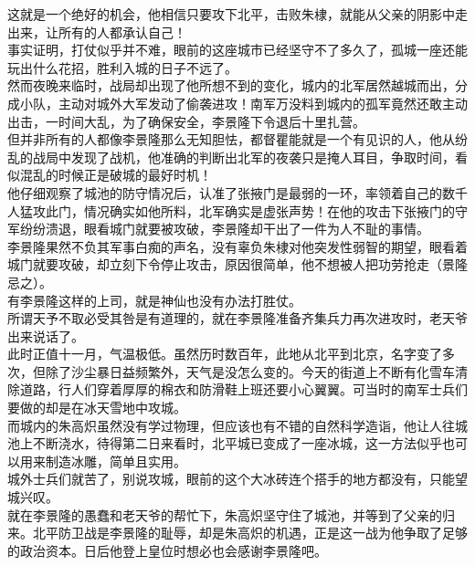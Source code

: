 \begin{multicols}{\theparacolNo}
这就是一个绝好的机会，他相信只要攻下北平，击败朱棣，就能从父亲的阴影中走出来，让所有的人都承认自己！\\

事实证明，打仗似乎并不难，眼前的这座城市已经坚守不了多久了，孤城一座还能玩出什么花招，胜利入城的日子不远了。\\

然而夜晚来临时，战局却出现了他所想不到的变化，城内的北军居然越城而出，分成小队，主动对城外大军发动了偷袭进攻！南军万没料到城内的孤军竟然还敢主动出击，一时间大乱，为了确保安全，李景隆下令退后十里扎营。\\

但并非所有的人都像李景隆那么无知胆怯，都督瞿能就是一个有见识的人，他从纷乱的战局中发现了战机，他准确的判断出北军的夜袭只是掩人耳目，争取时间，看似混乱的时候正是破城的最好时机！\\

他仔细观察了城池的防守情况后，认准了张掖门是最弱的一环，率领着自己的数千人猛攻此门，情况确实如他所料，北军确实是虚张声势！在他的攻击下张掖门的守军纷纷溃退，眼看城门就要被攻破，李景隆却干出了一件为人不耻的事情。\\

李景隆果然不负其军事白痴的声名，没有辜负朱棣对他突发性弱智的期望，眼看着城门就要攻破，却立刻下令停止攻击，原因很简单，他不想被人把功劳抢走（景隆忌之）。\\

有李景隆这样的上司，就是神仙也没有办法打胜仗。\\

所谓天予不取必受其咎是有道理的，就在李景隆准备齐集兵力再次进攻时，老天爷出来说话了。\\

此时正值十一月，气温极低。虽然历时数百年，此地从北平到北京，名字变了多次，但除了沙尘暴日益频繁外，天气是没怎么变的。今天的街道上不断有化雪车清除道路，行人们穿着厚厚的棉衣和防滑鞋上班还要小心翼翼。可当时的南军士兵们要做的却是在冰天雪地中攻城。\\

而城内的朱高炽虽然没有学过物理，但应该也有不错的自然科学造诣，他让人往城池上不断浇水，待得第二日来看时，北平城已变成了一座冰城，这一方法似乎也可以用来制造冰雕，简单且实用。\\

城外士兵们就苦了，别说攻城，眼前的这个大冰砖连个搭手的地方都没有，只能望城兴叹。\\

就在李景隆的愚蠢和老天爷的帮忙下，朱高炽坚守住了城池，并等到了父亲的归来。北平防卫战是李景隆的耻辱，却是朱高炽的机遇，正是这一战为他争取了足够的政治资本。日后他登上皇位时想必也会感谢李景隆吧。\\


\end{multicols}
